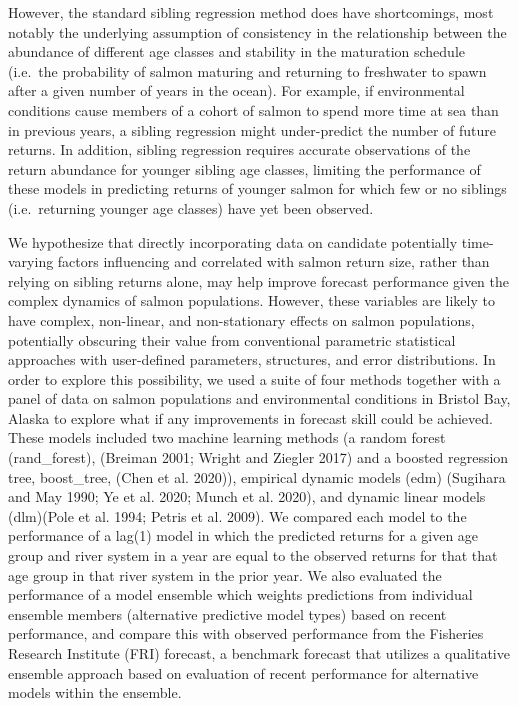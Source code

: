 \documentclass[
]{article}
\begin{document}
However, the standard sibling regression method does have shortcomings, most notably the underlying assumption of consistency in the relationship between the abundance of different age classes and stability in the maturation schedule (i.e.~the probability of salmon maturing and returning to freshwater to spawn after a given number of years in the ocean). For example, if environmental conditions cause members of a cohort of salmon to spend more time at sea than in previous years, a sibling regression might under-predict the number of future returns. In addition, sibling regression requires accurate observations of the return abundance for younger sibling age classes, limiting the performance of these models in predicting returns of younger salmon for which few or no siblings (i.e.~returning younger age classes) have yet been observed.

We hypothesize that directly incorporating data on candidate potentially time-varying factors influencing and correlated with salmon return size, rather than relying on sibling returns alone, may help improve forecast performance given the complex dynamics of salmon populations. However, these variables are likely to have complex, non-linear, and non-stationary effects on salmon populations, potentially obscuring their value from conventional parametric statistical approaches with user-defined parameters, structures, and error distributions. In order to explore this possibility, we used a suite of four methods together with a panel of data on salmon populations and environmental conditions in Bristol Bay, Alaska to explore what if any improvements in forecast skill could be achieved. These models included two machine learning methods (a random forest (rand\_forest), (Breiman 2001; Wright and Ziegler 2017) and a boosted regression tree, boost\_tree, (Chen et al. 2020)), empirical dynamic models (edm) (Sugihara and May 1990; Ye et al. 2020; Munch et al. 2020), and dynamic linear models (dlm)(Pole et al. 1994; Petris et al. 2009). We compared each model to the performance of a lag(1) model in which the predicted returns for a given age group and river system in a year are equal to the observed returns for that that age group in that river system in the prior year. We also evaluated the performance of a model ensemble which weights predictions from individual ensemble members (alternative predictive model types) based on recent performance, and compare this with observed performance from the Fisheries Research Institute (FRI) forecast, a benchmark forecast that utilizes a qualitative ensemble approach based on evaluation of recent performance for alternative models within the ensemble.
\end{document}
